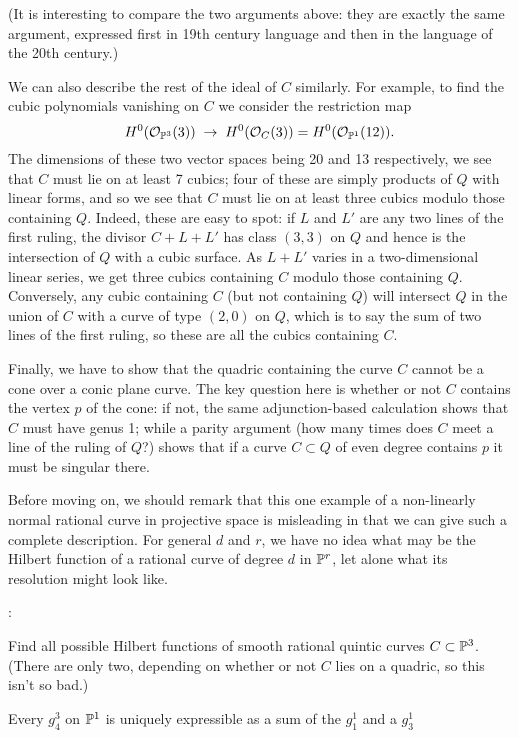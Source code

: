 (It is interesting to compare the two arguments above: they are exactly the same argument, expressed first in 19th century language and then in the language of the 20th century.)

We can also describe the rest of the ideal of $C$ similarly. For example, to find the cubic polynomials vanishing on $C$ we consider the restriction map
$$
H^0(\cO_{\PP^3}(3)) \; \to \; H^0(\cO_{C}(3)) = H^0(\cO_{\PP^1}(12)).
$$
The dimensions of these two vector spaces being 20 and 13 respectively, we see that $C$ must lie on at least 7 cubics; four of these are simply products of $Q$ with linear forms, and so we see that $C$ must lie on at least three cubics modulo those containing $Q$. Indeed, these are easy to spot: if $L$ and $L'$ are any two lines of the first ruling, the divisor $C + L + L'$ has class $(3,3)$ on $Q$ and hence is the intersection of $Q$ with a cubic surface. As $L+L'$ varies in a two-dimensional linear series, we get three cubics containing $C$ modulo those containing $Q$. Conversely, any cubic containing $C$ (but not containing $Q$) will intersect $Q$ in the union of $C$ with a curve of type $(2,0)$ on $Q$, which is to say the sum of two lines of the first ruling, so these are all the cubics containing $C$.

Finally, we have to show that the quadric containing the curve $C$ cannot be a cone over a conic plane curve. The key question here is whether or not $C$ contains the vertex $p$ of the cone: if not, the same adjunction-based calculation shows that $C$ must have genus 1; while a parity argument (how many times does $C$ meet a line of the ruling of $Q$?) shows that if a curve $C \subset Q$ of even degree contains $p$ it must be singular there.

Before moving on, we should remark that this one example of a non-linearly normal rational curve in projective space is misleading in that we can give such a complete description. For general $d$ and $r$, we have no idea what may be the Hilbert function of a rational curve of degree $d$ in $\PP^r$, let alone what its resolution might look like.

:

Find all possible Hilbert functions of smooth rational quintic  curves $C \subset \PP^3$. (There are only two, depending on whether or not $C$ lies on a quadric, so this isn't so bad.)

Every $g^3_4$ on $\PP^1$ is uniquely expressible as a sum of the $g_1^1$ and a $g^1_3$

